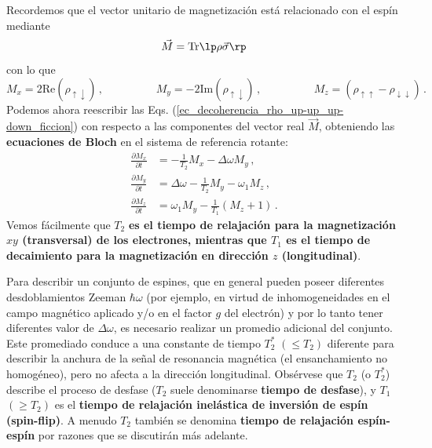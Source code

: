     Recordemos que el vector unitario de magnetización está relacionado con el espín mediante
    \begin{equation}
        \vec{M} = \text{Tr} \lp \rho \vec{\sigma} \rp
    \end{equation}
    con lo que
    \begin{equation}
        M_x = 2 \text{Re} (\rho_{\uparrow \downarrow})\, , \hspace{2cm}
        M_y = -2 \text{Im}(\rho_{\uparrow \downarrow}) \, , \hspace{2cm}	
        M_z = (\rho_{\uparrow \uparrow} - \rho_{\downarrow \downarrow}) \,.
    \end{equation}
    Podemos ahora reescribir las Eqs. (\ref{ec_decoherencia_rho_up-up_up-down_ficcion}) con respecto a las componentes del vector real $\vec{M}$, obteniendo las \textbf{ecuaciones de Bloch} en el sistema de referencia rotante:
    \begin{equation} 
        \begin{aligned}
        \frac{\partial M_x}{\partial t} & = - \frac{1}{T_2} M_x - \Delta\omega M_y \, , \\
        \frac{\partial M_y}{\partial t} & = \Delta\omega - \frac{1}{T_2} M_y - \omega_1 M_z\, , \\
        \frac{\partial M_z}{\partial t} & = \omega_1 M_y - \frac{1}{T_1} (M_z +1) \, .
        \end{aligned}
    \end{equation}
    Vemos fácilmente que $T_2$ \textbf{es el tiempo de relajación para la magnetización $xy$ (transversal) de los electrones, mientras que $T_1$ es el tiempo de decaimiento para la magnetización en dirección $z$ (longitudinal)}. 
    
    Para describir un conjunto de espines, que en general pueden poseer diferentes desdoblamientos Zeeman $\hbar \omega$ (por ejemplo, en virtud de inhomogeneidades en el campo magnético aplicado y/o en el factor $g$ del electrón) y por lo tanto tener diferentes valor de $\Delta\omega$, es necesario realizar un promedio adicional del conjunto. Este promediado conduce a una constante de tiempo $T^{*}_2$ $(\leq T_2)$ diferente para describir la anchura de la señal de resonancia magnética (el ensanchamiento no homogéneo), pero no afecta a la dirección longitudinal. Obsérvese que $T_2$ (o $T^{*}_2$) describe el proceso de desfase ($T_2$ suele denominarse \textbf{tiempo de desfase}), y $T_1$ $(\geq  T_2)$ es el \textbf{tiempo de relajación inelástica de inversión de espín (spin-flip)}. A menudo $T_2$ también se denomina \textbf{tiempo de relajación espín-espín} por razones que se discutirán más adelante. 
    
